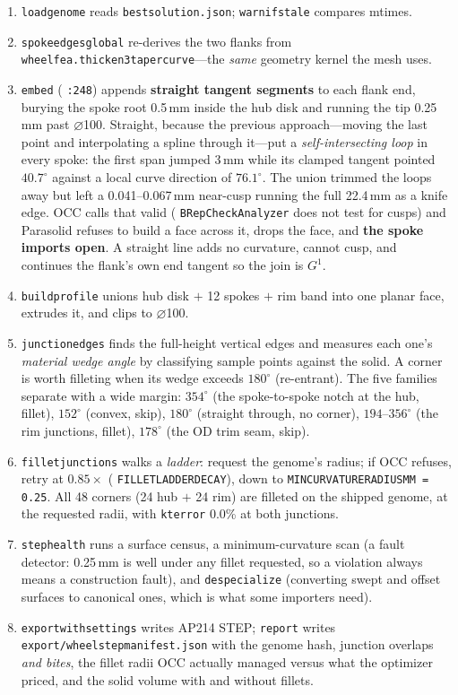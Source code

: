 \documentclass[11pt,a4paper]{article}
\DeclareRobustCommand{\code}[1]{%
  \texttt{\small\def\_{\textunderscore\discretionary{}{}{}}#1}}
\begin{document}
\begin{enumerate}
\item \code{load\_genome} reads \code{best\_solution.json}; \code{warn\_if\_stale}
  compares mtimes.
\item \code{spoke\_edges\_global} re-derives the two flanks from
  \code{wheel\_fea.thicken\_3taper\_curve}---the \emph{same} geometry kernel the mesh
  uses.
\item \code{\_embed} (\code{:248}) appends \textbf{straight tangent segments} to each
  flank end, burying the spoke root 0.5\,mm inside the hub disk and running the tip
  0.25\,mm past $\varnothing$100. Straight, because the previous approach---moving the
  last point and interpolating a spline through it---put a \emph{self-intersecting loop}
  in every spoke: the first span jumped 3\,mm while its clamped tangent pointed
  $40.7^\circ$ against a local curve direction of $76.1^\circ$. The union trimmed the
  loops away but left a 0.041--0.067\,mm near-cusp running the full 22.4\,mm as a knife
  edge. OCC calls that valid (\code{BRepCheck\_Analyzer} does not test for cusps) and
  Parasolid refuses to build a face across it, drops the face, and \textbf{the spoke
  imports open}. A straight line adds no curvature, cannot cusp, and continues the
  flank's own end tangent so the join is $G^1$.
\item \code{build\_profile} unions hub disk $+$ 12 spokes $+$ rim band into one planar
  face, extrudes it, and clips to $\varnothing$100.
\item \code{\_junction\_edges} finds the full-height vertical edges and measures each
  one's \emph{material wedge angle} by classifying sample points against the solid. A
  corner is worth filleting when its wedge exceeds $180^\circ$ (re-entrant). The five
  families separate with a wide margin: $354^\circ$ (the spoke-to-spoke notch at the
  hub, fillet), $152^\circ$ (convex, skip), $180^\circ$ (straight through, no corner),
  $194$--$356^\circ$ (the rim junctions, fillet), $178^\circ$ (the OD trim seam, skip).
\item \code{fillet\_junctions} walks a \emph{ladder}: request the genome's radius; if
  OCC refuses, retry at $0.85\times$ (\code{FILLET\_LADDER\_DECAY}), down to
  \code{MIN\_CURVATURE\_RADIUS\_MM = 0.25}. All 48 corners (24 hub $+$ 24 rim) are
  filleted on the shipped genome, at the requested radii, with \code{kt\_error} 0.0\% at
  both junctions.
\item \code{step\_health} runs a surface census, a minimum-curvature scan (a fault
  detector: 0.25\,mm is well under any fillet requested, so a violation always means a
  construction fault), and \code{despecialize} (converting swept and offset surfaces to
  canonical ones, which is what some importers need).
\item \code{\_export\_with\_settings} writes AP214 STEP; \code{report} writes
  \code{export/wheel\_step\_manifest.json} with the genome hash, junction overlaps
  \emph{and bites}, the fillet radii OCC actually managed versus what the optimizer
  priced, and the solid volume with and without fillets.
\end{enumerate}
\end{document}

